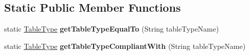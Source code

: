 \subsection*{Static Public Member Functions}
\begin{DoxyCompactItemize}
\item 
\mbox{\label{enumcom_1_1mysql_1_1jdbc_1_1_database_meta_data_1_1_table_type_a59a041c545fd68c81e6d3c89402555b0}} 
static \mbox{\hyperlink{enumcom_1_1mysql_1_1jdbc_1_1_database_meta_data_1_1_table_type}{Table\+Type}} {\bfseries get\+Table\+Type\+Equal\+To} (String table\+Type\+Name)
\item 
\mbox{\label{enumcom_1_1mysql_1_1jdbc_1_1_database_meta_data_1_1_table_type_a03ef3f8145d70fa66457aeea0b813789}} 
static \mbox{\hyperlink{enumcom_1_1mysql_1_1jdbc_1_1_database_meta_data_1_1_table_type}{Table\+Type}} {\bfseries get\+Table\+Type\+Compliant\+With} (String table\+Type\+Name)
\end{DoxyCompactItemize}
